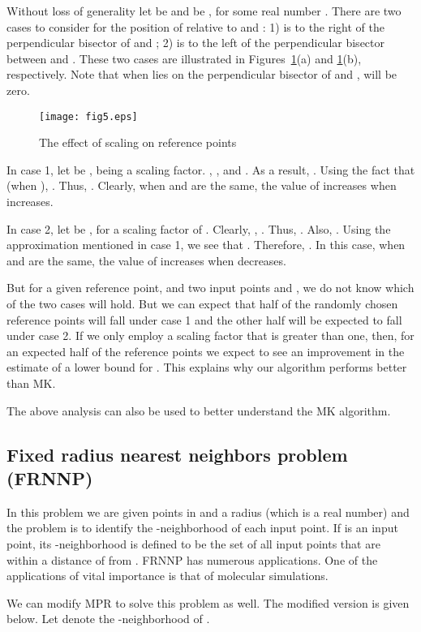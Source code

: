 \documentclass{article}
\theoremstyle{definition}
\theoremstyle{remark}
\begin{document}
Without loss of generality let  be  and  be , for some real number . There are two cases to consider for the position of  relative to  and : 1)  is to the right of the perpendicular bisector of  and ; 2)  is to the left of the perpendicular bisector between  and . These two cases are illustrated in Figures~\ref{fig2}(a) and \ref{fig2}(b), respectively. Note that when  lies on the perpendicular bisector of  and ,  will be zero.

\begin{figure}[h]
\texttt{[image: fig5.eps]}
\caption{The effect of scaling on reference points}\label{fig2}      \end{figure}

In case 1, let  be ,  being a scaling factor. , , and . As a result,  . Using the fact that  (when ), . Thus, . Clearly, when  and  are the same, the value of  increases when  increases.

In case 2, let  be , for a scaling factor of . Clearly, , . Thus, . Also, . Using the approximation mentioned in case 1, we see that . Therefore, . In this case, when  and  are the same, the value of  increases when  decreases.

But for a given reference point, and two input points  and , we do not know which of the two cases will hold. But we can expect that half of the randomly chosen reference points will fall under case 1 and the other half will be expected to fall under case 2. If we only employ a scaling factor  that is greater than one, then, for an expected half of the reference points we expect to see an improvement in the estimate of a lower bound for . This explains why our algorithm performs better than MK.

The above analysis can also be used to better understand the MK algorithm.

\subsection{Fixed radius nearest neighbors problem (FRNNP)}
In this problem we are given  points  in  and a radius  (which is a real number) and the problem is to identify the -neighborhood of each input point. If  is an input point, its -neighborhood is defined to be the set of all input points that are within a distance of  from . FRNNP has numerous applications. One of the applications of vital importance is that of molecular simulations.

We can modify {\sf MPR} to solve this problem as well. The modified version is given below. Let  denote the -neighborhood of .
\end{document}
